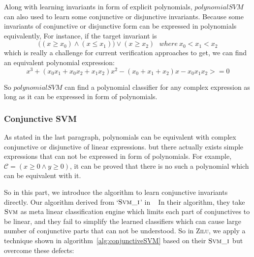 Along with learning invariants in form of explicit polynomials,
$polynomialSVM$ can also used to learn some conjunctive or disjunctive invariants.
Because some invariants of conjunctive or disjunctive form can be expressed in polynomials equivalently,
For instance, if the target invariant is 
$$\big((x \ge x_0) \wedge (x \le x_1)\big) \vee (x \ge x_2) ~~~where\ x_0 < x_1 < x_2$$
which is really a challenge for current verification approaches to get,
we can find an equivalent polynomial expression:
$$x^3 + (x_0x_1 + x_0x_2 + x_1x_2)x^2 - (x_0 + x_1 + x_2)x - x_0x_1x_2 >= 0$$

So $polynomialSVM$ can find a polynomial classifier for any complex expression as long as it can be expressed in form of polynomials.


\subsubsection{Conjunctive SVM}
As stated in the last paragraph, polynomials can be equivalent with complex conjunctive or disjunctive of linear expressions.
but there actually exists simple expressions that can not be expressed in form of polynomials.
For example, $\mathcal{C} = (x \ge 0 \wedge y \ge 0)$,
it can be proved that there is no such a polynomial which can be equivalent with it.

So in this part, we introduce the algorithm to learn conjunctive invariants directly.
Our algorithm derived from `$\textsc{Svm\_i}$' in ~\cite{sharma2012interpolants}
In their algorithm, they take $\textsc{Svm}$ as meta linear classification engine which limits each part of conjunctives to be linear, 
and they fail to simplify the learned classifiers which can cause large number of conjunctive parts that can not be understood.
So in \textsc{Zilu}, we apply a technique shown in algorithm~\ref{alg:conjunctiveSVM} based on their $\textsc{Svm\_i}$ but overcome these defects:

